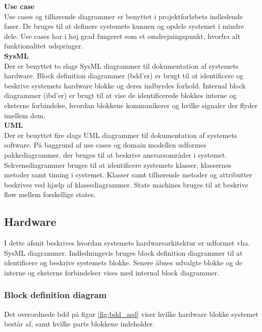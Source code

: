 \textbf{Use case}\\
Use cases og tilhørende diagrammer er benyttet i projektforløbets indledende faser. De bruges til at definere systemets kunnen og opdele systemet i mindre dele. Use cases har i høj grad fungeret som et omdrejningspunkt, hvorfra alt funktionalitet udspringer. \\


\textbf{SysML}\\
Der er benyttet to slags SysML diagrammer til dokumentation af systemets hardware. Block definition diagrammer (bdd'er) er brugt til at identificere og beskrive systemets hardware blokke og deres indbyrdes forhold. Internal block diagrammer (ibd'er) er brugt til at vise de identificerede blokkes interne og eksterne forbindelse, hvordan blokkene kommunikerer og hvilke signaler der flyder imellem dem. \\


\textbf{UML}\\
Der er benyttet fire slags UML diagrammer til dokumentation af systemets software.
På baggrund af use cases og domain modellen udformes pakkediagrammer, der bruges til at beskrive ansvarsområder i systemet. Sekvensdiagrammer bruges til at identificere systemets klasser, klassernes metoder samt timing i systemet. Klasser samt tilhørende metoder og attributter beskrives ved hjælp af klassediagrammer. State machines bruges til at beskrive flow mellem forskellige states. 


\newpage

\subsection{Hardware}
I dette afsnit beskrives hvordan systemets hardwarearkitektur er udformet vha. SysML diagrammer. Indledningsvis bruges block definition diagrammer til at identificere og beskrive systemets blokke. Senere åbnes udvalgte blokke og de interne og eksterne forbindelser vises med internal block diagrammer. 


\subsubsection*{Block definition diagram}

Det overordnede bdd på figur \ref{fig:bdd_asd} viser hvilke hardware blokke systemet består af, samt hvilke parts blokkene indeholder.


